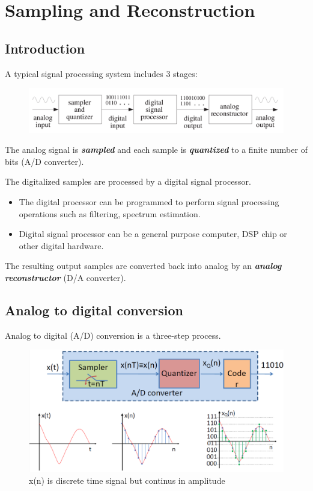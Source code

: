 \section{Sampling and Reconstruction}
\subsection{Introduction}
A typical signal processing system includes 3 stages:
\begin{figure}[h!]
    \centering
    \includegraphics[width=0.6\linewidth]{img/1.png}
\end{figure}

The analog signal is \textbf{\textit{sampled}} and each sample is \textbf{\textit{quantized}} to a finite number of bits (A/D converter).

The digitalized samples are processed by a digital signal processor.
\begin{itemize}
    \item The digital processor can be programmed to perform signal processing operations such as filtering, spectrum estimation.
    \item Digital signal processor can be a general purpose computer, DSP chip or other digital hardware.
\end{itemize}

The resulting output samples are converted back into analog by an \textbf{\textit{analog reconstructor}} (D/A converter).
\subsection{Analog to digital conversion}
Analog to digital (A/D) conversion is a three-step process.
\begin{figure}[h!]
    \centering
    \includegraphics[width=0.7\linewidth]{img/2.png}
    \caption{x(n) is discrete time signal but continus in amplitude}
\end{figure}

